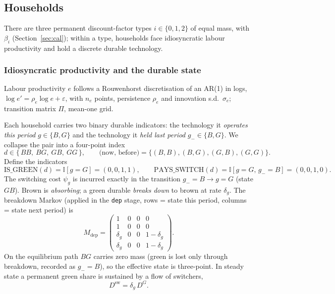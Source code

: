 \documentclass[11pt,a4paper]{article}
\newcommand{\I}{\mathbb{I}}
\newcommand{\dsw}{D^{\mathrm{sw}}}
\newcommand{\DG}{D^{G}}
\begin{document}
\subsection{Households}\label{sec:hh}

There are three permanent discount-factor types $i\in\{0,1,2\}$ of equal mass,
with $\beta_i$ (Section~\ref{sec:cal}); within a type, households face
idiosyncratic labour productivity and hold a discrete durable technology.

\subsubsection{Idiosyncratic productivity and the durable state}

Labour productivity $e$ follows a Rouwenhorst discretisation of an AR(1) in
logs, $\log e' = \rho_e \log e + \varepsilon$, with $n_e$ points, persistence
$\rho_e$ and innovation s.d.\ $\sigma_e$; transition matrix $\Pi$, mean-one grid.

Each household carries two binary durable indicators: the technology it
\emph{operates this period} $g\in\{B,G\}$ and the technology it \emph{held last
period} $g_-\in\{B,G\}$. We collapse the pair into a four-point index
\begin{equation}
d\in\{\,BB,\ BG,\ GB,\ GG\,\},\qquad
\text{(now, before)}=\{(B,B),(B,G),(G,B),(G,G)\}.
\end{equation}
Define the indicators
\begin{equation}
\mathrm{IS\_GREEN}(d)=\I[g=G]=(0,0,1,1),\qquad
\mathrm{PAYS\_SWITCH}(d)=\I[g=G,\,g_-=B]=(0,0,1,0).
\end{equation}
The switching cost $\psi_g$ is incurred exactly in the transition $g_-=B\to g=G$
(state $GB$). Brown is \emph{absorbing}; a green durable \emph{breaks down} to
brown at rate $\delta_g$. The breakdown Markov (applied in the \texttt{dep}
stage, rows = state this period, columns = state next period) is
\begin{equation}
M_{\mathrm{dep}}=
\begin{pmatrix}
1 & 0 & 0 & 0\\
1 & 0 & 0 & 0\\
\delta_g & 0 & 0 & 1-\delta_g\\
\delta_g & 0 & 0 & 1-\delta_g
\end{pmatrix}.
\end{equation}
On the equilibrium path $BG$ carries zero mass (green is lost only through
breakdown, recorded as $g_-=B$), so the effective state is three-point. In
steady state a permanent green share is sustained by a flow of switchers,
\begin{equation}
\dsw=\delta_g\,\DG. \label{eq:stockflow}
\end{equation}
\end{document}
